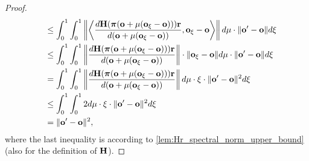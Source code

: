 \begin{proof}
\begin{equation*}
\begin{split}
    &\quad \le \int_0^1{  \int_0^1{ \left\| \left\langle \frac{d {\mathbf{H}} ( {\boldsymbol{\pi}}( {\mathbf{o}} + \mu( {\mathbf{o}}_{\xi} - {\mathbf{o}} ) ) ) {\mathbf{r}} }{d ( {\mathbf{o}} + \mu( {\mathbf{o}}_{\xi} - {\mathbf{o}} ) )}, {\mathbf{o}}_{\xi} - {\mathbf{o}} \right\rangle \right\| d\mu} \cdot \| {\mathbf{o}}^\prime - {\mathbf{o}} \| d\xi} \\
    &\quad \le \int_0^1{  \int_0^1{ \left\| \frac{d {\mathbf{H}} ( {\boldsymbol{\pi}}( {\mathbf{o}} + \mu( {\mathbf{o}}_{\xi} - {\mathbf{o}} ) ) ) {\mathbf{r}} }{d ( {\mathbf{o}} + \mu( {\mathbf{o}}_{\xi} - {\mathbf{o}} ) )} \right\| \cdot \| {\mathbf{o}}_{\xi} - {\mathbf{o}} \| d\mu} \cdot \| {\mathbf{o}}^\prime - {\mathbf{o}} \| d\xi} \\
    &\quad = \int_0^1{  \int_0^1{ \left\| \frac{d {\mathbf{H}} ( {\boldsymbol{\pi}}( {\mathbf{o}} + \mu( {\mathbf{o}}_{\xi} - {\mathbf{o}} ) ) ) {\mathbf{r}} }{d ( {\mathbf{o}} + \mu( {\mathbf{o}}_{\xi} - {\mathbf{o}} ) )} \right\| d\mu} \cdot \xi \cdot \| {\mathbf{o}}^\prime - {\mathbf{o}} \|^2 d\xi} \\
    &\quad \le \int_0^1{  \int_0^1{ 2 d\mu} \cdot \xi \cdot \| {\mathbf{o}}^\prime - {\mathbf{o}} \|^2 d\xi} \\
    &\quad = \| {\mathbf{o}}^\prime - {\mathbf{o}} \|^2,
\end{split}
\end{equation*}
where the last inequality is according to \cref{lem:Hr_spectral_norm_upper_bound} (also for the definition of ${\mathbf{H}}$).
\end{proof}

